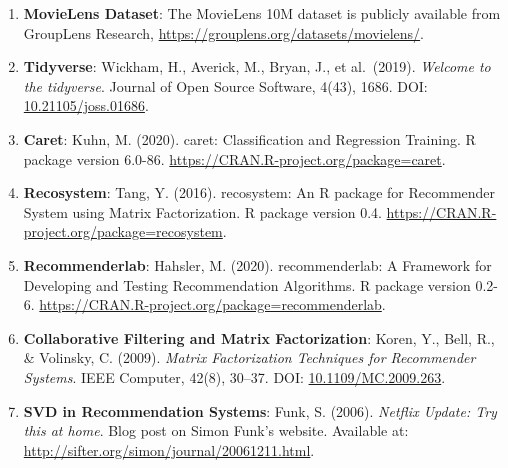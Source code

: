 \documentclass[
]{article}
\begin{document}
\begin{enumerate}
\def\labelenumi{\arabic{enumi}.}
\item
  \textbf{MovieLens Dataset}: The MovieLens 10M dataset is publicly
  available from GroupLens Research,
  \url{https://grouplens.org/datasets/movielens/}.
\item
  \textbf{Tidyverse}: Wickham, H., Averick, M., Bryan, J., et
  al.~(2019). \emph{Welcome to the tidyverse}. Journal of Open Source
  Software, 4(43), 1686. DOI:
  \href{https://doi.org/10.21105/joss.01686}{10.21105/joss.01686}.
\item
  \textbf{Caret}: Kuhn, M. (2020). caret: Classification and Regression
  Training. R package version 6.0-86.
  \url{https://CRAN.R-project.org/package=caret}.
\item
  \textbf{Recosystem}: Tang, Y. (2016). recosystem: An R package for
  Recommender System using Matrix Factorization. R package version 0.4.
  \url{https://CRAN.R-project.org/package=recosystem}.
\item
  \textbf{Recommenderlab}: Hahsler, M. (2020). recommenderlab: A
  Framework for Developing and Testing Recommendation Algorithms. R
  package version 0.2-6.
  \url{https://CRAN.R-project.org/package=recommenderlab}.
\item
  \textbf{Collaborative Filtering and Matrix Factorization}: Koren, Y.,
  Bell, R., \& Volinsky, C. (2009). \emph{Matrix Factorization
  Techniques for Recommender Systems}. IEEE Computer, 42(8), 30--37.
  DOI: \href{https://doi.org/10.1109/MC.2009.263}{10.1109/MC.2009.263}.
\item
  \textbf{SVD in Recommendation Systems}: Funk, S. (2006). \emph{Netflix
  Update: Try this at home}. Blog post on Simon Funk's website.
  Available at: \url{http://sifter.org/simon/journal/20061211.html}.
\end{enumerate}
\end{document}
